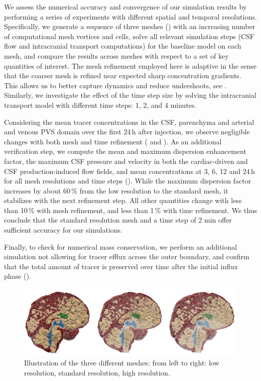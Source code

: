 We assess the numerical accuracy and convergence of our simulation results by performing a series of experiments with different spatial and temporal resolutions. Specifically, we generate a sequence of three meshes () with an increasing number of computational mesh vertices and cells, solve all relevant simulation steps (CSF flow and intracranial transport computations) for the baseline model on each mesh, and compare the results across meshes with respect to a set of key quantities of interest. The mesh refinement employed here is adaptive in the sense that the coarser mesh is refined near expected sharp concentration gradients. This allows us to better capture dynamics and reduce undershoots, see .  
Similarly, we investigate the effect of the time step size by solving the intracranial transport model with different time steps: 1, 2, and 4 minutes. 

Considering the mean tracer concentrations in the CSF, parenchyma and
arterial and venous PVS domain over the first 24\,h after injection,
we observe negligible changes with both mesh and time refinement
( and
). As an additional
verification step, we compute the mean and maximum dispersion
enhancement factor, the maximum CSF pressure and velocity in both the
cardiac-driven and CSF production-induced flow fields, and mean
concentrations at 3, 6, 12 and 24\,h for all mesh resolutions and time
steps (). While the maximum dispersion factor
increases by about 60\,\% from the low resolution to the standard mesh, it
stabilizes with the next refinement step. All other quantities change
with less than 10\,\% with mesh refinement, and less than 1\,\% with
time refinement. We thus conclude that the standard resolution mesh
and a time step of 2 min offer sufficient accuracy for our
simulations.

Finally, to check for numerical mass conservation, we perform an
additional simulation not allowing for tracer efflux across the outer
boundary, and confirm that the total amount of tracer is preserved
over time after the initial influx phase
().
\begin{figure}
    \centering
    \includegraphics[width=0.9\linewidth]{figures/mesh_refinement.png}
    \caption{Illustration of the three different meshes; from left to right: low resolution, standard resolution, high resolution.}
    \label{fig:mesh_refinement}
\end{figure}


